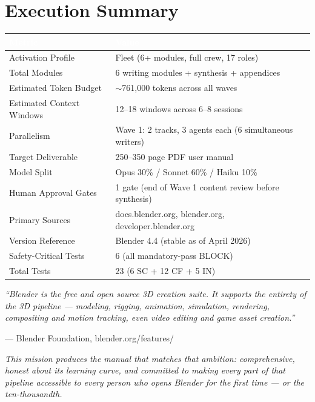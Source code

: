 \documentclass[11pt,letterpaper]{article}
\newcommand{\tableheader}[1]{\textbf{\sffamily\textcolor{white}{#1}}}
\begin{document}
\section{Execution Summary}

\begin{center}
\begin{tabularx}{\textwidth}{L{5cm}X}
\toprule
{}
\tableheader{Metric} & \tableheader{Value} \\
\midrule
Activation Profile & Fleet (6+ modules, full crew, 17 roles) \\
Total Modules & 6 writing modules + synthesis + appendices \\
Estimated Token Budget & $\sim$761,000 tokens across all waves \\
Estimated Context Windows & 12--18 windows across 6--8 sessions \\
Parallelism & Wave 1: 2 tracks, 3 agents each (6 simultaneous writers) \\
Target Deliverable & 250--350 page PDF user manual \\
Model Split & Opus 30\% / Sonnet 60\% / Haiku 10\% \\
Human Approval Gates & 1 gate (end of Wave 1 content review before synthesis) \\
Primary Sources & docs.blender.org, blender.org, developer.blender.org \\
Version Reference & Blender 4.4 (stable as of April 2026) \\
Safety-Critical Tests & 6 (all mandatory-pass BLOCK) \\
Total Tests & 23 (6 SC + 12 CF + 5 IN) \\
\bottomrule
\end{tabularx}
\end{center}

\vspace{2em}
\begin{quotebox}
\textit{``Blender is the free and open source 3D creation suite. It supports the entirety of the 3D pipeline --- modeling, rigging, animation, simulation, rendering, compositing and motion tracking, even video editing and game asset creation.''}

\vspace{0.5em}
--- Blender Foundation, blender.org/features/

\vspace{1em}
\textit{This mission produces the manual that matches that ambition: comprehensive, honest about its learning curve, and committed to making every part of that pipeline accessible to every person who opens Blender for the first time --- or the ten-thousandth.}
\end{quotebox}
\end{document}
